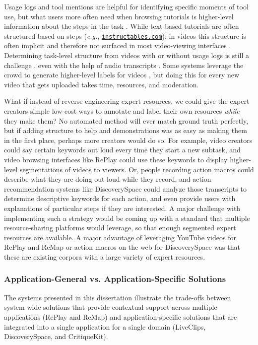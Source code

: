 Usage logs and tool mentions are helpful for identifying specific moments of tool use, but what users more often need when browsing tutorials is higher-level information about the steps in the task \cite{Pongnumkul2011, Harrison1995, Chi2012, Kim2014}. While text-based tutorials are often structured based on steps (\textit{e.g.}, \href{https://www.instructables.com/}{\nolinkurl{instructables.com}}), in videos this structure is often implicit and therefore not surfaced in most video-viewing interfaces \cite{Pavel2014}. Determining task-level structure from videos with or without usage logs is still a challenge \cite{Pongnumkul2011, Chi2012, Grossman2010}, even with the help of audio transcripts \cite{Fraser2020}. Some systems leverage the crowd to generate higher-level labels for videos \cite{Kim2014, Weir2015}, but doing this for every new video that gets uploaded takes time, resources, and moderation. 

What if instead of reverse engineering expert resources, we could give the expert creators simple low-cost ways to annotate and label their own resources \textit{while} they make them? No automated method will ever match ground truth perfectly, but if adding structure to help and demonstrations was as easy as making them in the first place, perhaps more creators would do so. For example, video creators could say certain keywords out loud every time they start a new subtask, and video browsing interfaces like RePlay could use these keywords to display higher-level segmentations of videos to viewers. Or, people recording action macros could describe what they are doing out loud while they record, and action recommendation systems like Discovery\-Space could analyze those transcripts to determine descriptive keywords for each action, and even provide users with explanations of particular steps if they are interested. A major challenge with implementing such a strategy would be coming up with a standard that multiple resource-sharing platforms would leverage, so that enough segmented expert resources are available. A major advantage of leveraging YouTube videos for RePlay and ReMap or action macros on the web for Discovery\-Space was that these are existing corpora with a large variety of expert resources.

\subsubsection{Application-General vs. Application-Specific Solutions}
The systems presented in this dissertation illustrate the trade-offs between system-wide solutions that provide contextual support across multiple applications (RePlay and ReMap) and application-specific solutions that are integrated into a single application for a single domain (LiveClips, DiscoverySpace, and CritiqueKit). 

